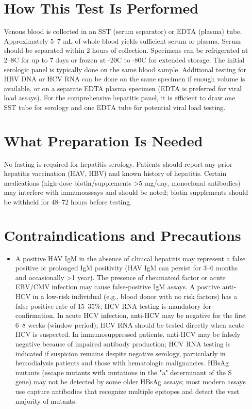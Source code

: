 \section*{How This Test Is Performed}
Venous blood is collected in an SST (serum separator) or EDTA (plasma) tube. Approximately 5--7 mL of whole blood yields sufficient serum or plasma. Serum should be separated within 2 hours of collection. Specimens can be refrigerated at 2--8\textdegree{}C for up to 7 days or frozen at -20\textdegree{}C to -80\textdegree{}C for extended storage. The initial serologic panel is typically done on the same blood sample. Additional testing for HBV DNA or HCV RNA can be done on the same specimen if enough volume is available, or on a separate EDTA plasma specimen (EDTA is preferred for viral load assays). For the comprehensive hepatitis panel, it is efficient to draw one SST tube for serology and one EDTA tube for potential viral load testing.

\section*{What Preparation Is Needed}
No fasting is required for hepatitis serology. Patients should report any prior hepatitis vaccination (HAV, HBV) and known history of hepatitis. Certain medications (high-dose biotin/supplements >5 mg/day, monoclonal antibodies) may interfere with immunoassays and should be noted; biotin supplements should be withheld for 48--72 hours before testing.

\section*{Contraindications and Precautions}
\begin{itemize}
  \item A positive HAV IgM in the absence of clinical hepatitis may represent a false positive or prolonged IgM positivity (HAV IgM can persist for 3--6 months and occasionally >1 year). The presence of rheumatoid factor or acute EBV/CMV infection may cause false-positive IgM assays. A positive anti-HCV in a low-risk individual (e.g., blood donor with no risk factors) has a false-positive rate of 15--35\%; HCV RNA testing is mandatory for confirmation. In acute HCV infection, anti-HCV may be negative for the first 6--8 weeks (window period); HCV RNA should be tested directly when acute HCV is suspected. In immunosuppressed patients, anti-HCV may be falsely negative because of impaired antibody production; HCV RNA testing is indicated if suspicion remains despite negative serology, particularly in hemodialysis patients and those with hematologic malignancies. HBsAg mutants (escape mutants with mutations in the "a" determinant of the S gene) may not be detected by some older HBsAg assays; most modern assays use capture antibodies that recognize multiple epitopes and detect the vast majority of mutants.
\end{itemize}
